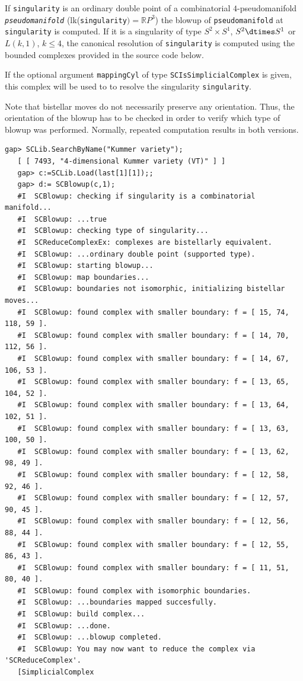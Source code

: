 \documentclass[a4paper,11pt]{report}
\begin{document}
{{{ If \texttt{singularity} is an ordinary double point of a combinatorial $4$-pseudomanifold \mbox{\texttt{\mdseries\slshape pseudomanifold}} (lk(\texttt{singularity}$) = \mathbb{R}P^3$) the blowup of \texttt{pseudomanifold} at \texttt{singularity} is computed. If it is a singularity of type $S^2 \times S^1$, $S^2 \dtimes S^1$ or $L(k,1)$, $k \leq 4$, the canonical resolution of \texttt{singularity} is computed using the bounded complexes provided in the source code below. 

 If the optional argument \texttt{mappingCyl} of type \texttt{SCIsSimplicialComplex} is given, this complex will be used to to resolve the singularity \texttt{singularity}.

 Note that bistellar moves do not necessarily preserve any orientation. Thus,
the orientation of the blowup has to be checked in order to verify which type
of blowup was performed. Normally, repeated computation results in both
versions. 
\begin{Verbatim}[commandchars=!@|,fontsize=\small,frame=single,label=Example]
   gap> SCLib.SearchByName("Kummer variety");
   [ [ 7493, "4-dimensional Kummer variety (VT)" ] ]
   gap> c:=SCLib.Load(last[1][1]);;                
   gap> d:= SCBlowup(c,1);
   #I  SCBlowup: checking if singularity is a combinatorial manifold...
   #I  SCBlowup: ...true
   #I  SCBlowup: checking type of singularity...
   #I  SCReduceComplexEx: complexes are bistellarly equivalent.
   #I  SCBlowup: ...ordinary double point (supported type).
   #I  SCBlowup: starting blowup...
   #I  SCBlowup: map boundaries...
   #I  SCBlowup: boundaries not isomorphic, initializing bistellar moves...
   #I  SCBlowup: found complex with smaller boundary: f = [ 15, 74, 118, 59 ].
   #I  SCBlowup: found complex with smaller boundary: f = [ 14, 70, 112, 56 ].
   #I  SCBlowup: found complex with smaller boundary: f = [ 14, 67, 106, 53 ].
   #I  SCBlowup: found complex with smaller boundary: f = [ 13, 65, 104, 52 ].
   #I  SCBlowup: found complex with smaller boundary: f = [ 13, 64, 102, 51 ].
   #I  SCBlowup: found complex with smaller boundary: f = [ 13, 63, 100, 50 ].
   #I  SCBlowup: found complex with smaller boundary: f = [ 13, 62, 98, 49 ].
   #I  SCBlowup: found complex with smaller boundary: f = [ 12, 58, 92, 46 ].
   #I  SCBlowup: found complex with smaller boundary: f = [ 12, 57, 90, 45 ].
   #I  SCBlowup: found complex with smaller boundary: f = [ 12, 56, 88, 44 ].
   #I  SCBlowup: found complex with smaller boundary: f = [ 12, 55, 86, 43 ].
   #I  SCBlowup: found complex with smaller boundary: f = [ 11, 51, 80, 40 ].
   #I  SCBlowup: found complex with isomorphic boundaries.
   #I  SCBlowup: ...boundaries mapped succesfully.
   #I  SCBlowup: build complex...
   #I  SCBlowup: ...done.
   #I  SCBlowup: ...blowup completed.
   #I  SCBlowup: You may now want to reduce the complex via 'SCReduceComplex'.
   [SimplicialComplex
   

\end{Verbatim}}}}
\end{document}
